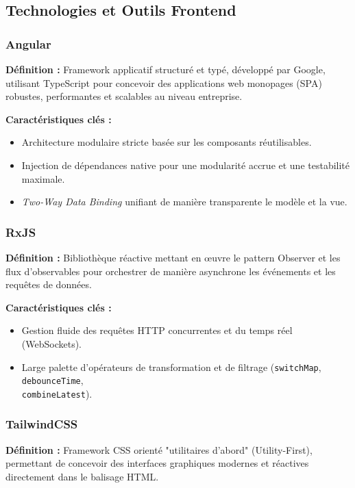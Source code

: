 \documentclass[a4paper,12pt]{article}
\begin{document}
\subsection{Technologies et Outils Frontend}

\subsubsection{Angular}
\textbf{Définition :} Framework applicatif structuré et typé, développé par Google, utilisant TypeScript pour concevoir des applications web monopages (SPA) robustes, performantes et scalables au niveau entreprise.

\textbf{Caractéristiques clés :}
\begin{itemize}[label=$\bullet$]
    \item Architecture modulaire stricte basée sur les composants réutilisables.
    \item Injection de dépendances native pour une modularité accrue et une testabilité maximale.
    \item \textit{Two-Way Data Binding} unifiant de manière transparente le modèle et la vue.
\end{itemize}

\subsubsection{RxJS}
\textbf{Définition :} Bibliothèque réactive mettant en œuvre le pattern Observer et les flux d'observables pour orchestrer de manière asynchrone les événements et les requêtes de données.

\textbf{Caractéristiques clés :}
\begin{itemize}[label=$\bullet$]
    \item Gestion fluide des requêtes HTTP concurrentes et du temps réel (WebSockets).
    \item Large palette d'opérateurs de transformation et de filtrage (\texttt{switchMap}, \texttt{debounceTime}, \\ \texttt{combineLatest}).
\end{itemize}

\subsubsection{TailwindCSS}
\textbf{Définition :} Framework CSS orienté "utilitaires d'abord" (Utility-First), permettant de concevoir des interfaces graphiques modernes et réactives directement dans le balisage HTML.
\end{document}
